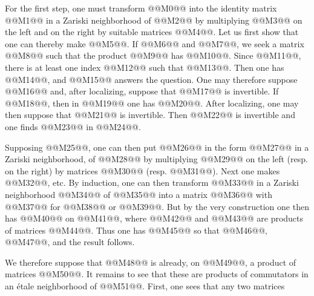 
For the first step, one must transform @@M0@@ into the identity matrix @@M1@@ in a Zariski neighborhood of @@M2@@ by multiplying @@M3@@ on the left and on the right by suitable matrices @@M4@@. Let us first show that one can thereby make @@M5@@. If @@M6@@ and @@M7@@, we seek a matrix @@M8@@ such that the product @@M9@@ has @@M10@@. Since @@M11@@, there is at least one index @@M12@@ such that @@M13@@. Then one has @@M14@@, and @@M15@@ answers the question. One may therefore suppose @@M16@@ and, after localizing, suppose that @@M17@@ is invertible. If @@M18@@, then in @@M19@@ one has
@@M20@@. After localizing, one may then suppose that @@M21@@ is invertible. Then @@M22@@ is invertible and one finds @@M23@@ in @@M24@@.

Supposing @@M25@@, one can then put @@M26@@ in the form
@@M27@@
in a Zariski neighborhood, of @@M28@@ by multiplying @@M29@@ on the left (resp. on the right) by matrices @@M30@@ (resp. @@M31@@). Next one makes @@M32@@, etc. By induction, one can then transform @@M33@@ in a Zariski neighborhood @@M34@@ of @@M35@@ into a matrix @@M36@@ with @@M37@@ for @@M38@@ or @@M39@@. But by the very construction one then has @@M40@@ on @@M41@@, where @@M42@@ and @@M43@@ are products of matrices @@M44@@. Thus one has
@@M45@@
so that @@M46@@, @@M47@@, and the result follows.

We therefore suppose that @@M48@@ is already, on @@M49@@, a product of matrices @@M50@@.
It remains to see that these are products of commutators in an étale neighborhood of @@M51@@. First, one sees that any two matrices
